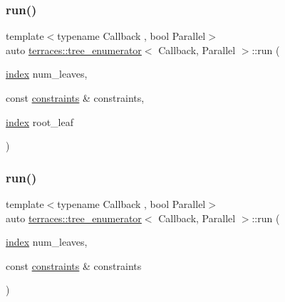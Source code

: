 \subsubsection{\texorpdfstring{run()}{run()}\hspace{0.1cm}{\footnotesize\ttfamily [1/3]}}
{\footnotesize\ttfamily template$<$typename Callback , bool Parallel$>$ \\
auto \hyperlink{classterraces_1_1tree__enumerator}{terraces\+::tree\+\_\+enumerator}$<$ Callback, Parallel $>$\+::run (\begin{DoxyParamCaption}\item[{\hyperlink{namespaceterraces_adbc33ccb543d1634e96d0eb02e472c77}{index}}]{num\+\_\+leaves,  }\item[{const \hyperlink{namespaceterraces_a6f603ffd30ed4d902fce6424492e0581}{constraints} \&}]{constraints,  }\item[{\hyperlink{namespaceterraces_adbc33ccb543d1634e96d0eb02e472c77}{index}}]{root\+\_\+leaf }\end{DoxyParamCaption})}

\mbox{\label{classterraces_1_1tree__enumerator_a933db3e1e37840e6a217bc1faca3194b}} 
\subsubsection{\texorpdfstring{run()}{run()}\hspace{0.1cm}{\footnotesize\ttfamily [2/3]}}
{\footnotesize\ttfamily template$<$typename Callback , bool Parallel$>$ \\
auto \hyperlink{classterraces_1_1tree__enumerator}{terraces\+::tree\+\_\+enumerator}$<$ Callback, Parallel $>$\+::run (\begin{DoxyParamCaption}\item[{\hyperlink{namespaceterraces_adbc33ccb543d1634e96d0eb02e472c77}{index}}]{num\+\_\+leaves,  }\item[{const \hyperlink{namespaceterraces_a6f603ffd30ed4d902fce6424492e0581}{constraints} \&}]{constraints }\end{DoxyParamCaption})}

\mbox{\label{classterraces_1_1tree__enumerator_a7d5262aee9bc2a40318b39314838dc92}} 
